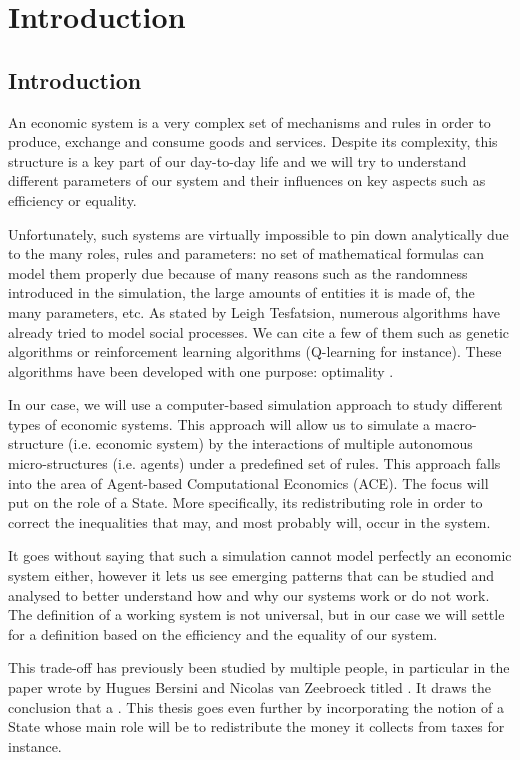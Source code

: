 \chapter{Introduction}

\section{Introduction}

An economic system is a very complex set of mechanisms and rules in order to produce, exchange and consume goods and services. Despite its complexity, this structure is a key part of our day-to-day life and we will try to understand different parameters of our system and their influences on key aspects such as efficiency or equality.

Unfortunately, such systems are virtually impossible to pin down analytically due to the many roles, rules and parameters: no set of mathematical formulas can model them properly due because of many reasons such as the randomness introduced in the simulation, the large amounts of entities it is made of, the many parameters, etc.
As stated by Leigh Tesfatsion, numerous algorithms have already tried to model social processes. We can cite a few of them such as genetic algorithms or reinforcement learning algorithms (Q-learning for instance). These algorithms have been developed with one purpose: optimality \cite{tesfatsion_bottom_up}. 

In our case, we will use a computer-based simulation approach to study different types of economic systems. This approach will allow us to simulate a macro-structure (i.e. economic system) by the interactions of multiple autonomous micro-structures (i.e. agents) under a predefined set of rules. This approach falls into the area of Agent-based Computational Economics (ACE). The focus will put on the role of a State. More specifically, its redistributing role in order to correct the inequalities that may, and most probably will, occur in the system. 

It goes without saying that such a simulation cannot model perfectly an economic system either, however it lets us see emerging patterns that can be studied and analysed to better understand how and why our systems work or do not work. The definition of a working system is not universal, but in our case we will settle for a definition based on the efficiency and the equality of our system.

This trade-off has previously been studied by multiple people, in particular in the paper wrote by Hugues Bersini and Nicolas van Zeebroeck titled  \cite{bersini}. It draws the conclusion that a . This thesis goes even further by incorporating the notion of a State whose main role will be to redistribute the money it collects from taxes for instance. 


